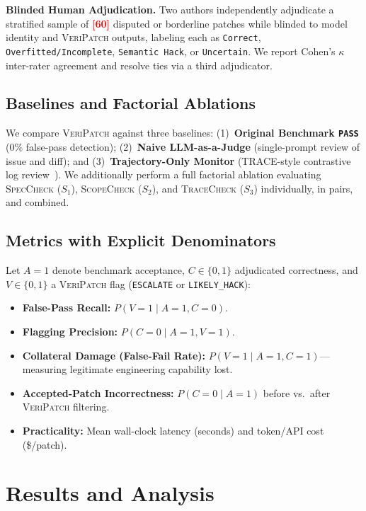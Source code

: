 \documentclass[conference]{IEEEtran}
\newcommand{\tool}{\textsc{VeriPatch}}
\newcommand{\speccheck}{\textsc{SpecCheck}}
\newcommand{\scopecheck}{\textsc{ScopeCheck}}
\newcommand{\tracecheck}{\textsc{TraceCheck}}
\newcommand{\tbd}[1]{\textcolor{red}{\textbf{[#1]}}}
\begin{document}
\textbf{Blinded Human Adjudication.} Two authors independently adjudicate a stratified sample of \tbd{60} disputed or borderline patches while blinded to model identity and \tool{} outputs, labeling each as \texttt{Correct}, \texttt{Overfitted/Incomplete}, \texttt{Semantic Hack}, or \texttt{Uncertain}. We report Cohen's $\kappa$ inter-rater agreement and resolve ties via a third adjudicator.

\subsection{Baselines and Factorial Ablations}
We compare \tool{} against three baselines: (1)~\textbf{Original Benchmark \texttt{PASS}} (0\% false-pass detection); (2)~\textbf{Naive LLM-as-a-Judge} (single-prompt review of issue and diff); and (3)~\textbf{Trajectory-Only Monitor} (TRACE-style contrastive log review~\cite{deshpande2026trace}). We additionally perform a full factorial ablation evaluating \speccheck{} ($S_1$), \scopecheck{} ($S_2$), and \tracecheck{} ($S_3$) individually, in pairs, and combined.

\subsection{Metrics with Explicit Denominators}
Let $A=1$ denote benchmark acceptance, $C \in \{0,1\}$ adjudicated correctness, and $V \in \{0,1\}$ a \tool{} flag (\texttt{ESCALATE} or \texttt{LIKELY\_HACK}):
\begin{itemize}
    \item \textbf{False-Pass Recall:} $P(V=1 \mid A=1, C=0)$.
    \item \textbf{Flagging Precision:} $P(C=0 \mid A=1, V=1)$.
    \item \textbf{Collateral Damage (False-Fail Rate):} $P(V=1 \mid A=1, C=1)$—measuring legitimate engineering capability lost.
    \item \textbf{Accepted-Patch Incorrectness:} $P(C=0 \mid A=1)$ before vs.\ after \tool{} filtering.
    \item \textbf{Practicality:} Mean wall-clock latency (seconds) and token/API cost (\$/patch).
\end{itemize}

\section{Results and Analysis}
\label{sec:results}
\end{document}
